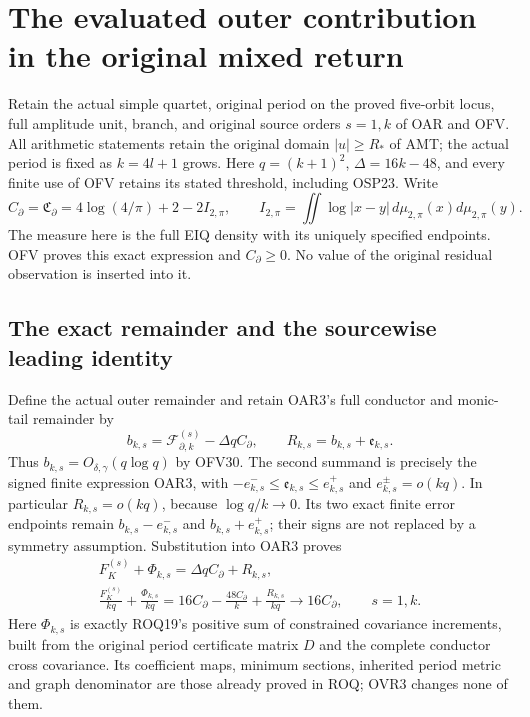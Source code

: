 \documentclass[11pt,a4paper]{article}
\begin{document}

\clearpage
\section{The evaluated outer contribution in the original mixed return}
\label{sec:OVR}

Retain the actual simple quartet, original period on the proved five-orbit
locus, full amplitude unit, branch, and original source orders $s=1,k$ of
OAR and OFV. All arithmetic statements retain the original domain
$|u|\ge R_*$ of AMT; the actual period is fixed as $k=4l+1$ grows.
Here $q=(k+1)^2$, $\Delta=16k-48$, and every finite use of OFV retains
its stated threshold, including OSP23. Write
\[
 C_\partial=\mathfrak C_\partial
 =4\log(4/\pi)+2-2I_{2,\pi},\qquad
 I_{2,\pi}=\iint\log|x-y|\,d\mu_{2,\pi}(x)d\mu_{2,\pi}(y).
 \tag{OVR1}
\]
The measure here is the full EIQ density with its uniquely specified
endpoints. OFV proves this exact expression and $C_\partial\ge0$.
No value of the original residual observation is inserted into it.

\subsection{The exact remainder and the sourcewise leading identity}
Define the actual outer remainder and retain OAR3's full conductor and
monic-tail remainder by
\[
 b_{k,s}=\mathcal F_{\partial,k}^{(s)}-\Delta q C_\partial,
 \qquad
 R_{k,s}=b_{k,s}+\mathfrak e_{k,s}.
 \tag{OVR2}
\]
Thus $b_{k,s}=O_{\delta,\gamma}(q\log q)$ by OFV30. The second
summand is precisely the signed finite expression OAR3, with
$-e_{k,s}^-\le\mathfrak e_{k,s}\le e_{k,s}^+$ and
$e_{k,s}^\pm=o(kq)$. In particular $R_{k,s}=o(kq)$, because
$\log q/k\to0$. Its two exact finite error endpoints remain
$b_{k,s}-e_{k,s}^-$ and $b_{k,s}+e_{k,s}^+$; their signs are
not replaced by a symmetry assumption. Substitution into OAR3 proves
\[
 \begin{gathered}
 F_K^{(s)}+\Phi_{k,s}=\Delta q C_\partial+R_{k,s},\\
 \frac{F_K^{(s)}}{kq}+\frac{\Phi_{k,s}}{kq}
       =16C_\partial-\frac{48C_\partial}{k}
                         +\frac{R_{k,s}}{kq}
       \longrightarrow16C_\partial,\qquad s=1,k.
 \end{gathered}\tag{OVR3}
\]
Here $\Phi_{k,s}$ is exactly ROQ19's positive sum of constrained
covariance increments, built from the original period certificate
matrix $D$ and the complete conductor cross covariance. Its coefficient
maps, minimum sections, inherited period metric and graph denominator
are those already proved in ROQ; OVR3 changes none of them.
\end{document}
